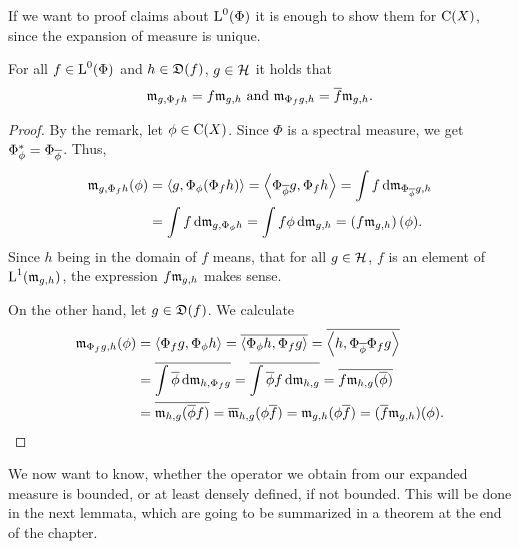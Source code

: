 \begin{rem}

If we want to proof claims about ${\text{L}^0}(\Phi)$ it is enough to show them for 
$\operatorname{C}(X)$, since  the expansion of measure is unique.
 
\end{rem}

\begin{lem} \label{lemlinm}
 
  For all $f \in {\text{L}^0}(\Phi)$ and $h \in \mathfrak{D}(f)$, $g\in \mathcal{H}$ it holds that
 \[
 \mathfrak{m}_{g, \Phi_f h} = f\mathfrak{m}_{g,h} \text{ and } \mathfrak{m}_{\Phi_f g, h} = \overline{f}\mathfrak{m}_{g,h}.
 \]

\end{lem}

\begin{proof}
 By the remark, let $\phi \in \operatorname{C}(X)$. Since $\Phi$ is a spectral measure,
 we get $\Phi_\phi ^{*} = \Phi_{\overline{\phi}}$. Thus,
 \begin{align*}
   \mathfrak{m}_{g, \Phi_f h}(\phi) &= \left\langle g, \Phi_\phi (\Phi_f h) \right\rangle 
			  = \left\langle \Phi_{\overline{\phi}}g , \Phi_f h \right\rangle
			  = \int f \operatorname{d}\! \mathfrak{m}_{\Phi_{\overline{\phi}} g, h}\\
			  &= \int f \operatorname{d}\! \mathfrak{m}_{g, \Phi_\phi h}
			  = \int f \phi \operatorname{d}\! \mathfrak{m}_{g,h}
			  = \left( f \mathfrak{m}_{g,h} \right)(\phi).
 \end{align*}
 Since $h$ being in the domain of $f$ means, that for all $g \in \mathcal{H}$,
 $f$ is an element of $ \text{L}^1(\mathfrak{m}_{g,h})$, the expression  $f \mathfrak{m}_{g,h} $ 
 makes sense.
 
 On the other hand, let $g \in \mathfrak{D}(f)$. We calculate
 \begin{align*}
   \mathfrak{m}_{\Phi_f g , h}(\phi) &= \left\langle \Phi_f g, \Phi_\phi h \right\rangle = 
   \overline{\left\langle \Phi_\phi h, \Phi_f g \right\rangle} =
   \overline{\left\langle h, \Phi_{\overline{\phi}} \Phi_f g \right\rangle}\\
   &= \overline{\int \overline{\phi} \operatorname{d}\! \mathfrak{m}_{h, \Phi_f g}}
   = \overline{\int \overline{\phi}f \operatorname{d}\! \mathfrak{m}_{h,  g}}
   = \overline{f\mathfrak{m}_{h, g}(\overline{\phi})}\\
   &= \overline{\mathfrak{m}_{h,g}(\overline{\phi}f)}
   = \overline{\mathfrak{m}}_{h,g }(\phi \overline{f}) 
   = \mathfrak{m}_{g,h}(\phi \overline{f})
   = (\overline{f} \mathfrak{m}_{g,h})(\phi).
 \end{align*}

 
\end{proof}

We now want to know, whether the operator we obtain from our expanded measure
is bounded, or at least densely defined, if not bounded. This will be done in the next
lemmata, which are going to be summarized in a theorem at the end of the
chapter.

